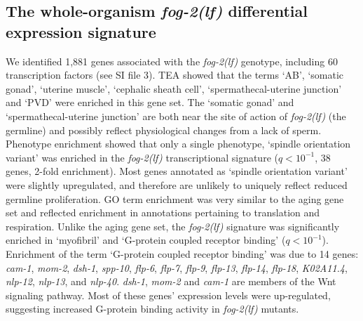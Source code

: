 \documentclass[9pt,twocolumn,twoside]{gsag3jnl}
\newcommand{\fog}{\emph{\mbox{fog-2(lf)}}}
\newcommand{\gene}[1]{\emph{\mbox{#1}}}
\newcommand{\fogn}{1,881}
\newcommand{\tffog}{60}
\begin{document}
\subsection*{The whole-organism \fog{} differential expression signature}
We identified \fogn{} genes associated with the \fog{} genotype, including
\tffog{} transcription factors (see SI file 3). TEA showed that the terms `AB',
`somatic gonad', `uterine muscle', `cephalic sheath cell',
`spermathecal-uterine junction' and `PVD' were enriched in this gene set. The
`somatic gonad' and `spermathecal-uterine junction' are both near the site of
action of \fog{} (the germline) and possibly reflect physiological changes from
a lack of sperm.
Phenotype enrichment showed that only a single phenotype, `spindle orientation
variant' was enriched in the \fog{} transcriptional signature ($q<10^{-1}$, 38
genes, 2-fold enrichment). Most genes annotated as `spindle orientation variant'
were slightly upregulated, and therefore are unlikely to uniquely reflect reduced
germline proliferation. GO term enrichment was very similar to the aging gene
set and reflected enrichment in annotations pertaining to translation and
respiration. Unlike the aging gene set, the \fog{} signature was
significantly enriched in `myofibril' and `G-protein coupled receptor binding'
($q<10^{-1}$). Enrichment of the term `G-protein coupled receptor binding' was
due to 14 genes: \gene{cam-1}, \gene{mom-2},  \gene{dsh-1}, \gene{spp-10},
\gene{flp-6}, \gene{flp-7}, \gene{flp-9}, \gene{flp-13}, \gene{flp-14},
\gene{flp-18},
\gene{K02A11.4}, \gene{nlp-12}, \gene{nlp-13}, and \gene{nlp-40}.
\gene{dsh-1},
\gene{mom-2} and \gene{cam-1} are members of the Wnt signaling pathway.
Most of these genes' expression levels were up-regulated, suggesting increased
G-protein binding activity in \fog{} mutants.
\end{document}
